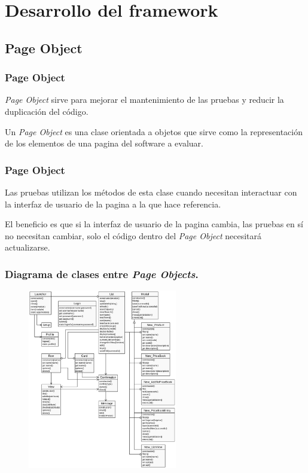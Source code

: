 \documentclass{beamer}
\begin{document}
\section{Desarrollo del framework}

\subsection{Page Object}

\begin{frame}
\frametitle{Page Object}
\emph{Page Object} sirve para mejorar el mantenimiento de las pruebas y reducir
la duplicación del código.

Un \emph{Page Object} es una clase orientada a
objetos que sirve como la representación de los elementos de una pagina del
software a evaluar.
\end{frame}

\begin{frame}
\frametitle{Page Object}
Las pruebas utilizan los métodos de esta clase cuando
necesitan interactuar con la interfaz de usuario de la pagina a la que hace
referencia.

El beneficio es que si la interfaz de usuario de la pagina cambia,
las pruebas en sí no necesitan cambiar, solo el código dentro del
\emph{Page Object} necesitará actualizarse.
\end{frame}

\begin{frame}
\frametitle{Diagrama de clases entre \emph{Page Objects}.}
\begin{figure}
\centering
\includegraphics[width=0.58\textwidth]{graphics/figure2.eps}
\end{figure}
\end{frame}
\end{document}
